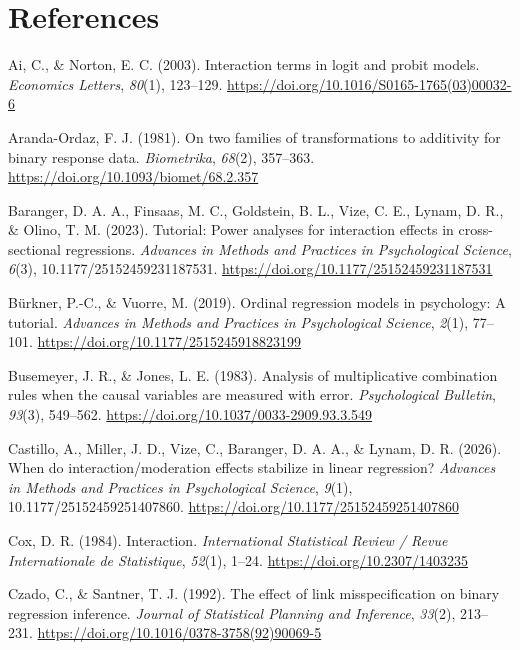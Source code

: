 \documentclass[
  man,
  longtable,
  nolmodern,
  notxfonts,
  notimes,
  colorlinks=true,linkcolor=blue,citecolor=blue,urlcolor=blue]{apa7}
\newlength{\cslhangindent}
\newenvironment{CSLReferences}[2] %
 {\begin{list}{}{%
  \setlength{\itemindent}{0pt}
  \setlength{\leftmargin}{0pt}
  \setlength{\parsep}{0pt}
  \ifodd #1
   \setlength{\leftmargin}{\cslhangindent}
   \setlength{\itemindent}{-1\cslhangindent}
  \fi
  \setlength{\itemsep}{#2\baselineskip}}}
 {\end{list}}
\begin{document}
\section{References}\label{references}

\label{refs}
\begin{CSLReferences}{1}{0}
Ai, C., \& Norton, E. C. (2003). Interaction terms in logit and probit
models. \emph{Economics Letters}, \emph{80}(1), 123--129.
\url{https://doi.org/10.1016/S0165-1765(03)00032-6}

Aranda-Ordaz, F. J. (1981). On two families of transformations to
additivity for binary response data. \emph{Biometrika}, \emph{68}(2),
357--363. \url{https://doi.org/10.1093/biomet/68.2.357}

Baranger, D. A. A., Finsaas, M. C., Goldstein, B. L., Vize, C. E.,
Lynam, D. R., \& Olino, T. M. (2023). Tutorial: Power analyses for
interaction effects in cross-sectional regressions. \emph{Advances in
Methods and Practices in Psychological Science}, \emph{6}(3),
10.1177/25152459231187531.
\url{https://doi.org/10.1177/25152459231187531}

Bürkner, P.-C., \& Vuorre, M. (2019). Ordinal regression models in
psychology: A tutorial. \emph{Advances in Methods and Practices in
Psychological Science}, \emph{2}(1), 77--101.
\url{https://doi.org/10.1177/2515245918823199}

Busemeyer, J. R., \& Jones, L. E. (1983). Analysis of multiplicative
combination rules when the causal variables are measured with error.
\emph{Psychological Bulletin}, \emph{93}(3), 549--562.
\url{https://doi.org/10.1037/0033-2909.93.3.549}

Castillo, A., Miller, J. D., Vize, C., Baranger, D. A. A., \& Lynam, D.
R. (2026). When do interaction/moderation effects stabilize in linear
regression? \emph{Advances in Methods and Practices in Psychological
Science}, \emph{9}(1), 10.1177/25152459251407860.
\url{https://doi.org/10.1177/25152459251407860}

Cox, D. R. (1984). Interaction. \emph{International Statistical Review /
Revue Internationale de Statistique}, \emph{52}(1), 1--24.
\url{https://doi.org/10.2307/1403235}

Czado, C., \& Santner, T. J. (1992). The effect of link misspecification
on binary regression inference. \emph{Journal of Statistical Planning
and Inference}, \emph{33}(2), 213--231.
\url{https://doi.org/10.1016/0378-3758(92)90069-5}


\end{CSLReferences}
\end{document}
